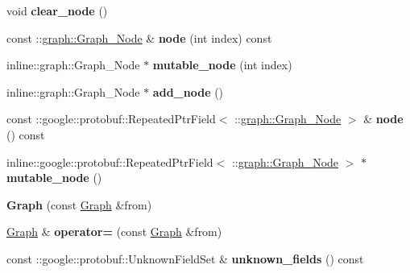 \begin{DoxyCompactItemize}
\item 
\hypertarget{classgraph_1_1Graph_ad4899b84d05fc768fa335047725eaf24}{
void {\bfseries clear\_\-node} ()}
\label{classgraph_1_1Graph_ad4899b84d05fc768fa335047725eaf24}

\item 
\hypertarget{classgraph_1_1Graph_a16c29597fce7e931ed6fa7ff051a722e}{
const ::\hyperlink{classgraph_1_1Graph__Node}{graph::Graph\_\-Node} \& {\bfseries node} (int index) const }
\label{classgraph_1_1Graph_a16c29597fce7e931ed6fa7ff051a722e}

\item 
\hypertarget{classgraph_1_1Graph_a8c2e072edc54bb1450c7d9753e52e99e}{
inline::graph::Graph\_\-Node $\ast$ {\bfseries mutable\_\-node} (int index)}
\label{classgraph_1_1Graph_a8c2e072edc54bb1450c7d9753e52e99e}

\item 
\hypertarget{classgraph_1_1Graph_a853cde9df8f6492ca9b949c0e82f8eff}{
inline::graph::Graph\_\-Node $\ast$ {\bfseries add\_\-node} ()}
\label{classgraph_1_1Graph_a853cde9df8f6492ca9b949c0e82f8eff}

\item 
\hypertarget{classgraph_1_1Graph_a2bd47191520de5c1dc375cea07f61330}{
const ::google::protobuf::RepeatedPtrField$<$ ::\hyperlink{classgraph_1_1Graph__Node}{graph::Graph\_\-Node} $>$ \& {\bfseries node} () const }
\label{classgraph_1_1Graph_a2bd47191520de5c1dc375cea07f61330}

\item 
\hypertarget{classgraph_1_1Graph_a2a98be1966ff5f910c8746ffc563a1a8}{
inline::google::protobuf::RepeatedPtrField$<$ ::\hyperlink{classgraph_1_1Graph__Node}{graph::Graph\_\-Node} $>$ $\ast$ {\bfseries mutable\_\-node} ()}
\label{classgraph_1_1Graph_a2a98be1966ff5f910c8746ffc563a1a8}

\item 
\hypertarget{classgraph_1_1Graph_a400fcc675124ef60cbc0d6ee0e25736c}{
{\bfseries Graph} (const \hyperlink{classgraph_1_1Graph}{Graph} \&from)}
\label{classgraph_1_1Graph_a400fcc675124ef60cbc0d6ee0e25736c}

\item 
\hypertarget{classgraph_1_1Graph_a2bb8b8cdf8632d9a9453b3f67d0eef9c}{
\hyperlink{classgraph_1_1Graph}{Graph} \& {\bfseries operator=} (const \hyperlink{classgraph_1_1Graph}{Graph} \&from)}
\label{classgraph_1_1Graph_a2bb8b8cdf8632d9a9453b3f67d0eef9c}

\item 
\hypertarget{classgraph_1_1Graph_a4944a9b85ffdbecf91ec2454f915b411}{
const ::google::protobuf::UnknownFieldSet \& {\bfseries unknown\_\-fields} () const }
\label{classgraph_1_1Graph_a4944a9b85ffdbecf91ec2454f915b411}


\end{DoxyCompactItemize}

